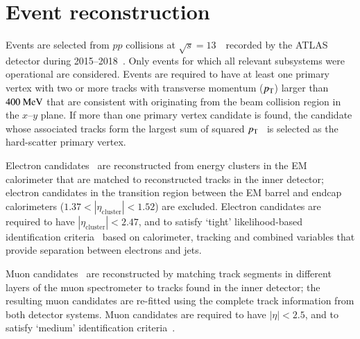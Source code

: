 \section{Event reconstruction}
\label{sec:objects}

Events are selected from $pp$ collisions at $\sqrt{s}=13$~\TeV\ recorded by the ATLAS detector during 2015--2018~\cite{DAPR-2018-01}.
Only events for which all relevant subsystems were operational are considered.
Events are required to have at least one primary vertex with two or more tracks with transverse momentum
($p_{\text{T}}$) larger than $400~\text{MeV}$ that are consistent with originating from the 
beam collision region in the $x$--$y$ plane. If more than one primary vertex candidate is found, the
candidate whose associated tracks form the largest sum of squared $p_{\text{T}}$~\cite{ATL-PHYS-PUB-2015-026}
is selected as the hard-scatter primary vertex.

Electron candidates~\cite{EGAM-2018-01} are reconstructed from energy 
clusters in the EM calorimeter that are matched to reconstructed tracks in the inner detector;
electron candidates in the transition region between the EM barrel and endcap calorimeters 
($1.37 < |\eta_{\textrm{cluster}}| < 1.52$) are excluded.
Electron candidates are required to have $|\eta_{\textrm{cluster}}| < 2.47$, and to satisfy `tight' likelihood-based identification 
criteria~\cite{PERF-2016-01}
based on calorimeter, tracking and combined variables that provide 
separation between electrons and jets. 

Muon candidates~\cite{MUON-2018-03} are reconstructed by matching track segments in %
different layers of the muon spectrometer to tracks found in the inner detector;
the resulting muon candidates are re-fitted using the complete track information from both detector systems.
Muon candidates are required to have $|\eta|<2.5$, and to satisfy `medium' identification criteria~\cite{Aad:2016jkr}. 

